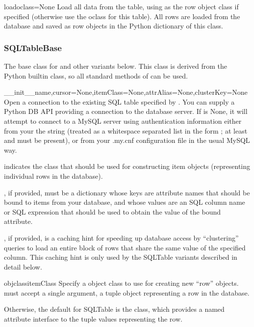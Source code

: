 \documentclass{howto}
\begin{document}
\begin{funcdesc}{load}{oclass=None}
  Load all data from the table, using  as the row object
  class if specified (otherwise use the oclass for this table).
  All rows are loaded from the database and saved as row objects
  in the Python dictionary of this class.
\end{funcdesc}

\subsubsection{SQLTableBase}
The base class for  and other variants below.
This class is derived from
the Python builtin  class, so all standard methods of 
can be used.

\begin{funcdesc}{__init__}{name,cursor=None,itemClass=None,attrAlias=None,clusterKey=None}
  Open a connection to the existing SQL table specified by .
  You can supply a Python DB API  providing a connection
  to the database server.  If  is None, it will attempt
  to connect to a MySQL server using authentication information either
  from your the  string (treated as a whitespace separated
  list in the form    ;
  at least  and  must be present), or from your 
  .my.cnf configuration file in the usual MySQL way.

   indicates 
  the class that should be used for constructing item objects (representing
  individual rows in the database).

  , if provided, must be a dictionary whose keys are
  attribute names that should be bound to items from your database,
  and whose values are an SQL column name or SQL expression that should
  be used to obtain the value of the bound attribute.

  , if provided, is a caching hint for speeding up
  database access by ``clustering'' queries to load an entire block
  of rows that share the same value of the specified  column.
  This caching hint is only used by the  SQLTable variants
  described in detail below.
\end{funcdesc}

\begin{funcdesc}{objclass}{itemClass}
  Specify a object class to use for creating new ``row'' objects.
   must accept a single argument, a tuple object representing
  a row in the database.  

  Otherwise, the default  for SQLTable is
  the  class, which provides a named attribute interface
  to the tuple values representing the row.
\end{funcdesc}
\end{document}
